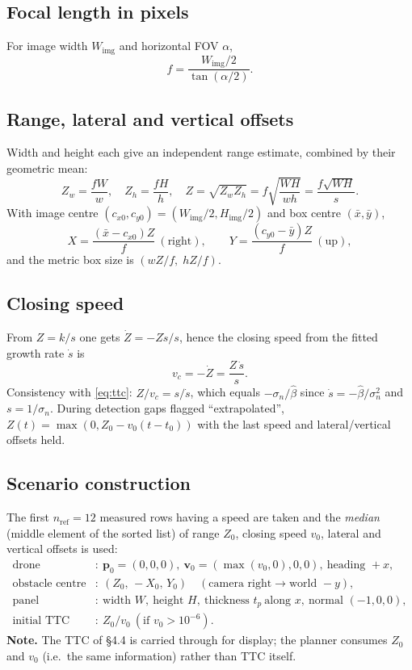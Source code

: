 \documentclass[11pt,a4paper]{article}
\newcommand{\vc}[1]{\bm{#1}}
\newcommand{\hatv}[1]{\widehat{#1}}
\begin{document}
\subsection{Focal length in pixels}
For image width $W_{\text{img}}$ and horizontal FOV $\alpha$,
\begin{equation}
f=\frac{W_{\text{img}}/2}{\tan(\alpha/2)}.
\end{equation}

\subsection{Range, lateral and vertical offsets}
Width and height each give an independent range estimate, combined by their geometric mean:
\begin{equation}
Z_w=\frac{fW}{w},\quad Z_h=\frac{fH}{h},\quad Z=\sqrt{Z_wZ_h}=f\sqrt{\frac{WH}{wh}}=\frac{f\sqrt{WH}}{s}.
\end{equation}
With image centre $(c_{x0},c_{y0})=(W_{\text{img}}/2,H_{\text{img}}/2)$ and box centre $(\bar x,\bar y)$,
\begin{equation}
X=\frac{(\bar x-c_{x0})Z}{f}\ (\text{right}),\qquad Y=\frac{(c_{y0}-\bar y)Z}{f}\ (\text{up}),
\end{equation}
and the metric box size is $(wZ/f,\;hZ/f)$.

\subsection{Closing speed}
From $Z=k/s$ one gets $\dot Z=-Z\dot s/s$, hence the closing speed from the fitted growth rate $\dot s$ is
\begin{equation}
v_c=-\dot Z=\frac{Z\,\dot s}{s}.
\end{equation}
Consistency with \eqref{eq:ttc}: $Z/v_c=s/\dot s$, which equals $-\sigma_n/\hatv\beta$ since $\dot s=-\hatv\beta/\sigma_n^2$ and $s=1/\sigma_n$.
During detection gaps flagged ``extrapolated'', $Z(t)=\max(0,Z_0-v_0(t-t_0))$ with the last speed and lateral/vertical offsets held.

\subsection{Scenario construction}
The first $n_{\text{ref}}=12$ measured rows having a speed are taken and the \emph{median} (middle element of the sorted list) of range $Z_0$, closing speed $v_0$, lateral and vertical offsets is used:
\begin{align}
\text{drone}&:\ \vc p_0=(0,0,0),\ \vc v_0=(\max(v_0,0),0,0),\ \text{heading }+x,\\
\text{obstacle centre}&:\ (Z_0,\,-X_0,\,Y_0)\quad(\text{camera right}\to\text{world }-y),\\
\text{panel}&:\ \text{width }W,\ \text{height }H,\ \text{thickness }t_p\ \text{along }x,\ \text{normal }(-1,0,0),\\
\text{initial TTC}&:\ Z_0/v_0\ (\text{if }v_0>10^{-6}).
\end{align}
\textbf{Note.} The TTC of \S4.4 is carried through for display; the planner consumes $Z_0$ and $v_0$ (i.e.\ the same information) rather than TTC itself.
\end{document}
